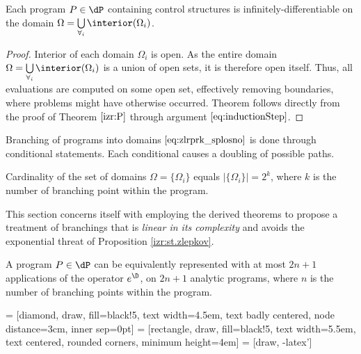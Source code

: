  \begin{theorem}\label{izr:diferentiableOnDomain}
 Each program $P\in\dP$ containing control structures is infinitely-differentiable on the domain $\Omega=\bigcup\limits_{\forall_i}\interior(\Omega_i)$.
 \end{theorem}
 \begin{proof}
  Interior of each domain $\Omega_i$ is open. As the entire domain $\Omega=\bigcup\limits_{\forall_i}\interior(\Omega_i)$ is a union of open sets, it is therefore open itself. Thus, all evaluations are computed on some open set, effectively removing boundaries, where problems might have otherwise occurred. Theorem follows directly from the proof of Theorem $\ref{izr:P}$ through argument $\eqref{eq:inductionStep}$.
 \end{proof}
 

Branching of programs into domains $\eqref{eq:zlrprk_splosno}$ is done through conditional statements. Each conditional causes a doubling of possible paths.

\begin{proposition}\label{izr:st.zlepkov}
Cardinality of the set of domains $\Omega=\{\Omega_i\}$ equals $\lvert\{\Omega_i
\}\rvert=2^k$, where $k$ is the number of branching point within the program.
\end{proposition}

This section concerns itself with employing the derived theorems to propose a treatment of branchings that is \emph{linear in its complexity} and avoids the exponential threat of Proposition \ref{izr:st.zlepkov}.

\begin{theorem}\label{izr:2n+1}
A program $P\in\dP$ can be equivalently represented with at most $2n+1$
applications of the operator $e^\D$, on $2n+1$ analytic programs, where
$n$ is the number of branching points within the program.
\end{theorem}

 = [diamond, draw, fill=black!5, 
    text width=4.5em, text badly centered, node distance=3cm, inner sep=0pt]
 = [rectangle, draw, fill=black!5, 
    text width=5.5em, text centered, rounded corners, minimum height=4em]
 = [draw, -latex']


